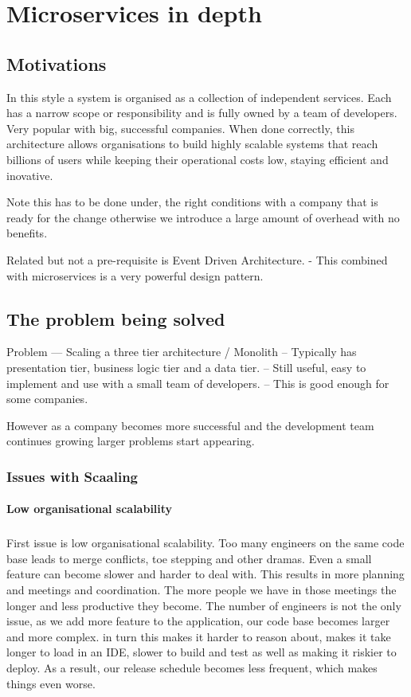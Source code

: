 \chapter{Microservices in depth}

\section{Motivations}
In this style a system is organised as a collection of independent services.
Each has a narrow scope or responsibility and is fully owned by a team of developers.
Very popular with big, successful companies.
When done correctly, this architecture allows organisations to build highly scalable systems that reach billions of users while keeping their operational costs low, staying efficient and inovative.

Note this has to be done under, the right conditions with a company that is ready for the change otherwise we introduce a large amount of overhead with no benefits.

Related but not a pre-requisite is Event Driven Architecture.
- This combined with microservices is a very powerful design pattern.


\section{The problem being solved}
Problem --- Scaling a three tier architecture / Monolith
-- Typically has presentation tier, business logic tier and a data tier.
-- Still useful, easy to implement and use with a small team of developers.
-- This is good enough for some companies.

However as a company becomes more successful and the development team continues growing larger problems start appearing.

\subsection{Issues with Scaaling}

\subsubsection{Low organisational scalability}

\paragraph{}
First issue is low organisational scalability.
Too many engineers on the same code base leads to merge conflicts, toe stepping and other dramas.
Even a small feature can become slower and harder to deal with.
This results in more planning and meetings and coordination.
The more people we have in those meetings the longer and less productive they become.
The number of engineers is not the only issue, as we add more feature to the application, our code base becomes larger and more complex.
in turn this makes it harder to reason about, makes it take longer to load in an IDE, slower to build and test as well as making it riskier to deploy.
As a result, our release schedule becomes less frequent, which makes things even worse.

